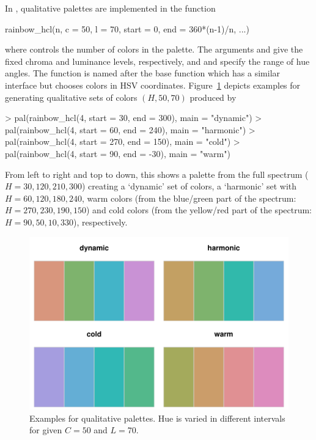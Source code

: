 \documentclass{Z}
\begin{document}
In , qualitative palettes are implemented in the function
\begin{Soutput}
rainbow_hcl(n, c = 50, l = 70, start = 0, end = 360*(n-1)/n, ...)
\end{Soutput}
where  controls the number of colors in the palette. The arguments
 and  give the fixed chroma and luminance levels, respectively,
and  and  specify the range of hue angles. The function
is named after the base  function  which has a similar
interface but chooses colors in HSV coordinates.
Figure~\ref{fig:pal-q-examples} depicts
examples for generating qualitative sets of colors $(H, 50, 70)$ produced by
\begin{Schunk}
\begin{Sinput}
> pal(rainbow_hcl(4, start = 30, end = 300), main = "dynamic")
> pal(rainbow_hcl(4, start = 60, end = 240), main = "harmonic")
> pal(rainbow_hcl(4, start = 270, end = 150), main = "cold")
> pal(rainbow_hcl(4, start = 90, end = -30), main = "warm")
\end{Sinput}
\end{Schunk}
From left to right and top to down, this shows a palette from the full spectrum ($H = 30, 120, 210, 300$)
creating a `dynamic' set of colors, a `harmonic'
set with $H = 60, 120, 180, 240$, warm colors (from the blue/green part of the spectrum: 
$H = 270, 230, 190, 150$) and cold colors (from the yellow/red part of the spectrum:
$H = 90, 50, 10, 330$), respectively.

\begin{figure}[p]
\begin{center}
\includegraphics{hcl-colors-pal-q1}
\caption{\label{fig:pal-q-examples} Examples for qualitative palettes. Hue is varied
in different intervals for given $C = 50$ and $L = 70$.}
\end{center}
\end{figure}
\end{document}
